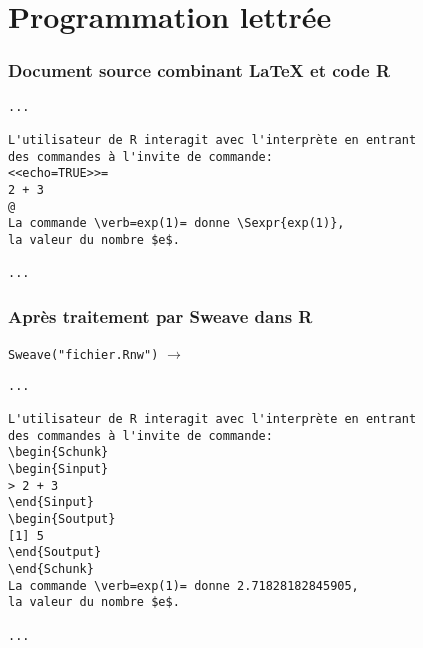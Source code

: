 \section{Programmation lettrée}

\begin{frame}[fragile=singleslide]
  \frametitle{Document source combinant {\LaTeX} et code R}

\begin{lstlisting}[emph={Sexpr}]
...

L'utilisateur de R interagit avec l'interprète en entrant
des commandes à l'invite de commande:
<<echo=TRUE>>=
2 + 3
@
La commande \verb=exp(1)= donne \Sexpr{exp(1)},
la valeur du nombre $e$.

...
\end{lstlisting}
\end{frame}

\begin{frame}[fragile=singleslide]
  \frametitle{Après traitement par Sweave dans R}

  \texttt{Sweave("fichier.Rnw")}
  $\rightarrow$ 
\begin{lstlisting}[emph={Schunk,Sinput,Soutput}]
...

L'utilisateur de R interagit avec l'interprète en entrant
des commandes à l'invite de commande:
\begin{Schunk}
\begin{Sinput}
> 2 + 3
\end{Sinput}
\begin{Soutput}
[1] 5
\end{Soutput}
\end{Schunk}
La commande \verb=exp(1)= donne 2.71828182845905,
la valeur du nombre $e$.

...
\end{lstlisting}

\end{frame}

